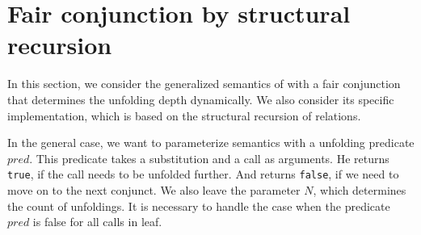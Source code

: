 \section{Fair conjunction by structural recursion}

In this section, we consider the generalized semantics of \mk with a fair conjunction that determines the unfolding depth dynamically. We also consider its specific implementation, which is based on the structural recursion of relations.

In the general case, we want to parameterize semantics with a unfolding predicate $pred$. This predicate takes a substitution and a call as arguments. He returns \lstinline{true}, if the call needs to be unfolded further. And returns \lstinline{false}, if we need to move on to the next conjunct. We also leave the parameter $N$, which determines the count of unfoldings. It is necessary to handle the case when the predicate $pred$ is false for all calls in leaf.

